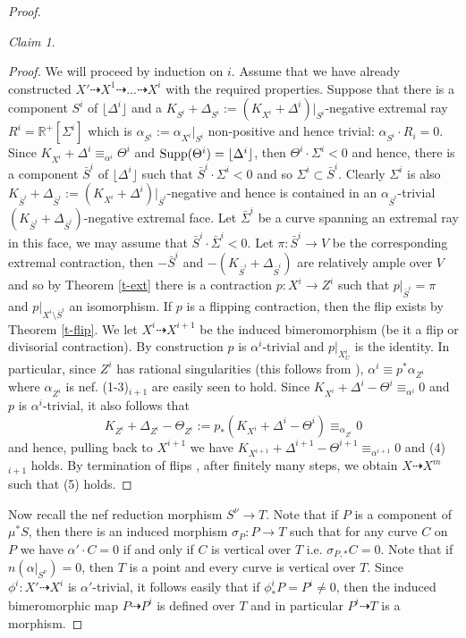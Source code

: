 \documentclass[12pt]{amsart}
\theoremstyle{plain}
\theoremstyle{remark}
\theoremstyle{definition}
\newcommand{\<}{\leq}
\newcommand{\R}{{\mathbb{R}}}
\theoremstyle{definition}
\theoremstyle{definition}
\numberwithin{equation}{section}
\theoremstyle{remark}
\newtheorem{claim}[theorem]{Claim}
\begin{document}
\begin{proof}
\begin{claim}
\end{claim}
\begin{proof}
We will proceed by induction on $i$. Assume that we have already constructed $X'\dasharrow X^1 \dasharrow \ldots \dasharrow X^i$ with the required properties.
Suppose that there is a component $S^i$ of $\lfloor \Delta ^i\rfloor$ and a $K_{S^i}+\Delta _{S^i}:=(K_{X^i}+\Delta ^i)|_{S^i}$-negative extremal ray $R^i=\R^+[\Sigma ^i]$ which is $\alpha _{S^i}:=\alpha _{X^i}|_{S^i}$ non-positive and hence trivial: $\alpha _{S^i}\cdot R_i=0$.
Since $K_{X^i}+\Delta ^i\equiv_{\alpha ^i} \Theta ^i$ and ${\rm Supp}(\Theta^i)=\lfloor \Delta ^i\rfloor$, then $\Theta^i \cdot \Sigma ^i<0$ and hence, there is a component $\bar S^i$ of $\lfloor \Delta ^i\rfloor$ such that $\bar S^i\cdot \Sigma ^i<0$ 
and so $\Sigma ^i\subset \bar S^i$. Clearly  $\Sigma ^i$ is also $K_{\bar S^i}+\Delta _{\bar S^i}:=(K_{X^i}+\Delta ^i)|_{\bar S^i}$-negative and hence is contained in an $\alpha _{\bar S^i}$-trivial $(K_{\bar S^i}+\Delta _{\bar S^i})$-negative extremal face. Let $\bar \Sigma ^i$ be a curve spanning an extremal ray in this face, we may assume that $\bar S^i\cdot \bar \Sigma ^i<0$. Let $\pi :\bar S^i\to V$ be the corresponding extremal contraction,
then $-\bar S^i $ and $-(K_{\bar S^i}+\Delta _{\bar S^i})$ are relatively ample over $V$ and so by Theorem \ref{t-ext} there is a contraction $p:X^i\to Z^i$ such that $p|_{\bar S^i}=\pi$ and $p|_{X^i\setminus \bar S^i}$ an isomorphism. If $p$ is a flipping contraction, then the flip exists by Theorem \ref{t-flip}.
We let $X^i\dasharrow X^{i+1}$ be the induced bimeromorphism (be it a flip or divisorial contraction).
By construction $p$ is $\alpha ^i$-trivial and $p|_{X^i_U}$ is the identity. In particular, since $Z^i$ has rational singularities (this follows from \cite[Lemma 2.41]{DH20}), $\alpha ^i\equiv p^*\alpha _{Z^i}$ where $\alpha _{Z^i}$ is nef.  (1-3)$_{i+1}$ are easily seen to hold.
Since $K_{X^i}+\Delta ^i-\Theta^i\equiv_{\alpha ^i} 0$ and $p$ is $\alpha ^i$-trivial, it also follows that \[K_{Z^i}+\Delta _{Z^i}-\Theta_{Z^i}:=p_*(K_{X^i}+\Delta ^i-\Theta^i)\equiv_{\alpha _{Z^i}} 0\] and hence, pulling back to $X^{i+1}$ we have $K_{X^{i+1}}+\Delta ^{i+1}-\Theta^{i+1}\equiv_{\alpha ^{i+1}} 0$ and (4)$_{i+1}$  holds.
By termination of flips \cite[Theorem 3.3]{DO23}, after finitely many steps, we obtain $X\dasharrow X^m$ such that 
(5) holds.
\end{proof}
Now recall the nef reduction morphism $S^\nu\to T$.  Note that if $P$ is a component of $\mu ^* S$, then there is an induced morphism $\sigma _P:P\to T$ such that for any curve $C$ on $P$ we have $\alpha '\cdot C=0$ if and only if $C$ is vertical over $T$ i.e. $\sigma _{P,*}C=0$. Note that if $n(\alpha|_{S^\nu})=0$, then $T$ is a point and every curve is vertical over $T$. Since $\phi ^i:X'\dasharrow X^i$ is $\alpha '$-trivial, it follows easily that if $\phi ^i_*P=P^i\ne 0$, then the induced bimeromorphic map $P\dasharrow P^i$ is defined over $T$ and in particular $P^i\dasharrow T$ is a morphism.

\end{proof}
\end{document}
